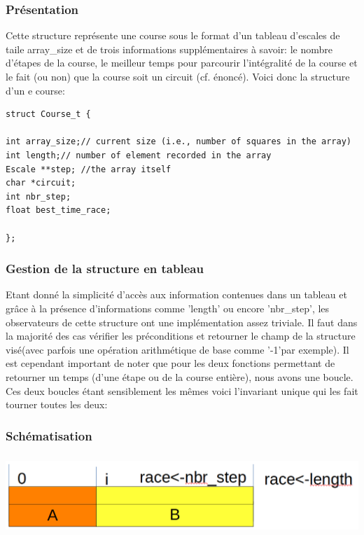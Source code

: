 \documentclass[a4paper, 11pt, oneside]{article}
\begin{document}
\subsubsection{Présentation}\label{presentation}
Cette structure représente une course sous le format d'un tableau d'escales de taile array\_size et de trois informations supplémentaires à savoir: le nombre d'étapes de la course, le meilleur temps pour parcourir l'intégralité de la course et le fait (ou non) que la course soit un circuit (cf. énoncé). Voici donc la structure d'un e course:
\begin{lstlisting}
struct Course_t {

int array_size;// current size (i.e., number of squares in the array)
int length;// number of element recorded in the array
Escale **step; //the array itself
char *circuit;
int nbr_step;
float best_time_race;

};
\end{lstlisting}

\subsubsection{Gestion de la structure en tableau}
Etant donné la simplicité d'accès aux information contenues dans un tableau et grâce à la présence d'informations comme 'length' ou encore 'nbr\_step', les observateurs de cette structure ont une implémentation assez triviale. Il faut dans la majorité des cas vérifier les préconditions et retourner le champ de la structure visé(avec parfois une opération arithmétique de base comme '-1'par exemple). Il est cependant important de noter que pour les deux fonctions permettant de retourner un temps (d'une étape ou de la course entière), nous avons une boucle. Ces deux boucles étant sensiblement les mêmes voici l'invariant unique qui les fait tourner toutes les deux:

\subsubsection{Schématisation}

\includegraphics[height=3cm, width=15cm]{GLIp2.png}
\end{document}
